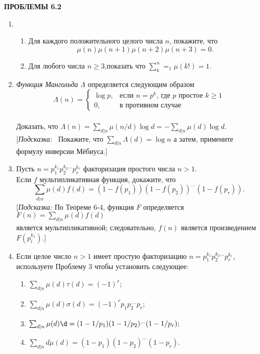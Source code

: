 \documentclass[11pt]{article}
\begin{document}
	\begin{center}
	\LARGE {\textsf {\textbf {ПРОБЛЕМЫ 6.2}}}\\[5mm]
\end{center}
\begin{enumerate}
\item 	\begin{enumerate}
\item Для каждого положительного целого числа $n$, покажите, что\\
\[\mu(n)\mu(n+1)\mu(n+2)\mu(n+3)=0.\]
\item Для любого числа $n\ge3$,показать что
$\sum_k^n=_1\mu(k!)=1.$
\end{enumerate}
\item {\it Функция Мангольда} $\Lambda$ определяется следующим образом\\
\[
\Lambda(n)=\begin{cases}
\log{p},&\text{если $n=p^k$, где $p$ простое $k\ge1$} \\
0,&\text{в противном случае}
\end{cases}\]\\
Доказать, что $\Lambda(n)=\sum_{d|n}\mu(n/d)\log{d}=-\sum_{d|n}\mu(d)\log{d}.$ [{\it Подсказка:} ~Покажите, что $\sum_{d|n}\Lambda(d)=\log{n}$ а затем, примените формулу инверсии Мёбиуса.]
\item Пусть $n=p_1^{k_1}p_2^{k_2\dots}p_r^{k_r}$ факторизация простого числа $n>1$.\\
 Если $f$ мультипликативная функция, докажите, что\\
\[
\sum_{d|n}\mu(d)f(d)=(1-f(p_1))(1-f(p_2))^{\dots} (1-f(p_r)).
\]
[{\itshape Подсказка:}\: По Теореме 6-4, функция $F$ определяется $F(n)=\sum_{d|n}\mu(d)f(d)$\\
 является мультипликативной; следовательно, $f(n)$ является произведением $F(p_i^{k_1})$.]
\item Если целое число $n>1$ имеет простую факторизацию $n=p_1^{k_1}p_2^{k_2\dots}p_r^{k_r}$, используете Проблему 3 чтобы установить следующее:
\begin{enumerate}
	\item $\sum_{d|n}\mu(d)\tau(d)=(-1)^r;$
	\setlength{\parskip}{3mm}
	\item $\sum_{d|n}\mu(d)\sigma(d)=(-1)^rp_1p_{2~} ^{~\dots}p_r;$
	\item $\sum_{d|n}\mu(d)\d=(1-1/p_1)(1-1/p_2)^{\dots}(1-1/p_r);$
	\item $\sum_{d|n}d\mu(d)=(1-p_1)(1-p_2)^{\dots}(1-p_r).$
\end{enumerate}

\end{enumerate}
\end{document}
